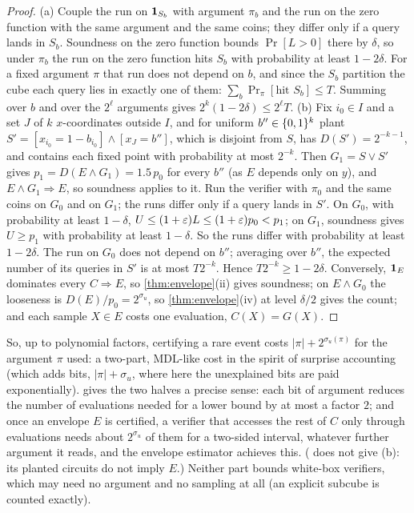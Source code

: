 \begin{proof}
(a) Couple the run on $\mathbf{1}_{S_b}$ with argument $\pi_b$ and the run on the
zero function with the same argument and the same coins; they differ only if a
query lands in $S_b$. Soundness on the zero function bounds $\Pr[L>0]$ there by
$\delta$, so under $\pi_b$ the run on the zero function hits $S_b$ with
probability at least $1-2\delta$. For a fixed argument $\pi$ that run does not
depend on $b$, and since the $S_b$ partition the cube each query lies in
exactly one of them: $\sum_b\Pr_\pi[\text{hit }S_b]\le T$. Summing over $b$
and over the $2^\ell$ arguments gives $2^k(1-2\delta)\le2^\ell T$. (b) Fix
$i_0\in I$ and a set $J$ of $k$ $x$-coordinates outside $I$, and for uniform
$b''\in\{0,1\}^k$ plant $S'=[x_{i_0}=1-b_{i_0}]\wedge[x_J=b'']$, which is disjoint from
$S$, has $D(S')=2^{-k-1}$, and contains each fixed point with probability at most
$2^{-k}$. Then $G_1=S\vee S'$ gives $p_1=D(E\wedge G_1)=1.5\,p_0$ for every $b''$
(as $E$ depends only on $y$), and $E\wedge G_1\Rightarrow E$, so soundness applies to
it. Run the verifier with $\pi_0$ and the same coins on $G_0$ and on $G_1$; the runs
differ only if a query lands in $S'$. On $G_0$, with probability at least $1-\delta$,
$U\le(1+\varepsilon)L\le(1+\varepsilon)p_0<p_1$; on $G_1$, soundness gives $U\ge p_1$ with
probability at least $1-\delta$. So the runs differ with probability at least
$1-2\delta$. The run on $G_0$ does not depend on $b''$; averaging over $b''$, the
expected number of its queries in $S'$ is at most $T2^{-k}$. Hence
$T2^{-k}\ge1-2\delta$. Conversely, $\mathbf{1}_E$ dominates every $C\Rightarrow E$, so
\cref{thm:envelope}(ii) gives soundness; on $E\wedge G_0$ the looseness is
$D(E)/p_0=2^{\sigma_u}$, so \cref{thm:envelope}(iv) at level $\delta/2$ gives the
count; and each sample $X\in E$ costs one evaluation, $C(X)=G(X)$.
\end{proof}

So, up to polynomial factors, certifying a rare event costs $|\pi|+2^{\sigma_u(\pi)}$
for the argument $\pi$ used: a two-part, MDL-like cost in the spirit of surprise
accounting \cite{hilton2024surprise} (which adds bits, $|\pi|+\sigma_u$, where
here the unexplained bits are paid exponentially).  gives
the two halves a precise sense: each bit of argument reduces the number of
evaluations needed for a lower bound by at most a factor $2$; and once an
envelope $E$ is certified, a verifier that accesses the rest of $C$ only through
evaluations needs about $2^{\sigma_u}$ of them for a two-sided interval, whatever
further argument it reads, and the envelope estimator achieves this. (
does not give (b): its planted circuits do not imply $E$.) Neither part bounds
white-box verifiers, which may need no argument and no sampling at all (an explicit
subcube is counted exactly).

